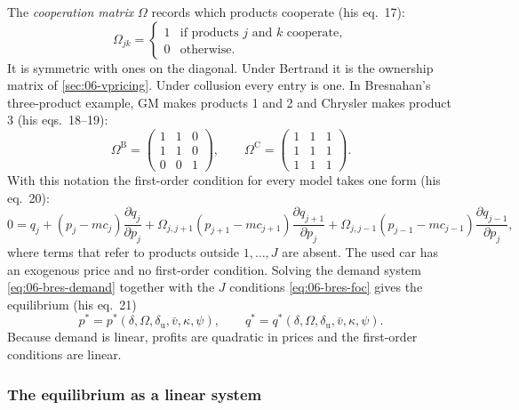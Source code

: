 The \emph{cooperation matrix} $\Omega$ records which products cooperate (his eq.~17):
\begin{equation}\label{eq:06-bres-omega}
  \Omega_{jk} = \begin{cases} 1 & \text{if products } j \text{ and } k \text{ cooperate},\\
  0 & \text{otherwise.}\end{cases}
\end{equation}
It is symmetric with ones on the diagonal. Under Bertrand it is the ownership matrix of \cref{sec:06-vpricing}.
Under collusion every entry is one. In Bresnahan's three-product example, GM makes products 1 and 2 and Chrysler
makes product 3 (his eqs.~18--19):
\begin{equation}\label{eq:06-bres-omega-ex}
  \Omega^{\mathrm B} = \begin{pmatrix} 1 & 1 & 0\\ 1 & 1 & 0\\ 0 & 0 & 1\end{pmatrix},
  \qquad
  \Omega^{\mathrm C} = \begin{pmatrix} 1 & 1 & 1\\ 1 & 1 & 1\\ 1 & 1 & 1\end{pmatrix}.
\end{equation}
With this notation the first-order condition for every model takes one form (his eq.~20):
\begin{equation}\label{eq:06-bres-foc}
  0 = q_j + (p_j - mc_j)\frac{\partial q_j}{\partial p_j}
      + \Omega_{j,j+1}(p_{j+1} - mc_{j+1})\frac{\partial q_{j+1}}{\partial p_j}
      + \Omega_{j,j-1}(p_{j-1} - mc_{j-1})\frac{\partial q_{j-1}}{\partial p_j},
\end{equation}
where terms that refer to products outside $1,\dots,J$ are absent. The used car has an exogenous price and no
first-order condition. Solving the demand system \eqref{eq:06-bres-demand} together with the $J$ conditions
\eqref{eq:06-bres-foc} gives the equilibrium (his eq.~21)
\begin{equation}\label{eq:06-bres-eqm}
  p^* = p^*(\delta, \Omega, \delta_{\mathrm u}, \bar v, \kappa, \psi),
  \qquad
  q^* = q^*(\delta, \Omega, \delta_{\mathrm u}, \bar v, \kappa, \psi).
\end{equation}
Because demand is linear, profits are quadratic in prices and the first-order conditions are linear.

\subsubsection{The equilibrium as a linear system}\label{sec:06-bres-equilibrium}

